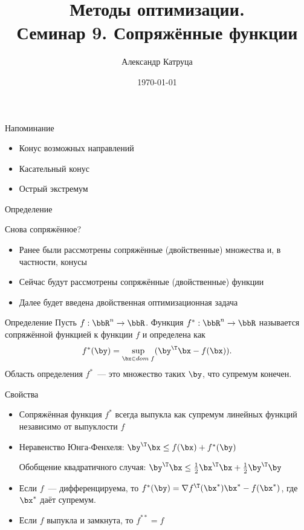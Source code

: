 \documentclass[12pt]{beamer}
\title[Семинар 9]{Методы оптимизации. \\
 Семинар 9. Сопряжённые функции}
\author{Александр Катруца}
\institute{Московский физико-технический институт,\\
Факультет Управления и Прикладной Математики}
\date{\today}
\begin{document}
\begin{frame}
\maketitle
\end{frame}

\begin{frame}{Напоминание}
\begin{itemize}
\item Конус возможных направлений
\item Касательный конус
\item Острый экстремум
\end{itemize}
\end{frame}

\begin{frame}{Определение}
\begin{block}{Снова сопряжённое?}
\begin{itemize}
\item Ранее были рассмотрены сопряжённые (двойственные) множества и, в частности, конусы
\item Сейчас будут рассмотрены сопряжённые (двойственные) функции
\item Далее будет введена двойственная оптимизационная задача 
\end{itemize}
\end{block}

\begin{block}{Определение}
Пусть $f: \bbR^n \rightarrow \bbR$. 
Функция $f^*: \bbR^n \rightarrow \bbR$ называется сопряжённой функцией к функции $f$ и определена как
\vspace{-4mm}
\[
f^*(\by) = \sup\limits_{\bx \in dom \; f} (\by^{\T}\bx - f(\bx)).
\vspace{-3mm}
\]
Область определения $f^*$~--- это множество таких $\by$, что супремум конечен. 

\end{block}
\end{frame}

\begin{frame}{Свойства}
\begin{itemize}
\item Сопряжённая функция $f^*$ всегда выпукла как супремум линейных функций независимо от выпуклости $f$
\item Неравенство Юнга-Фенхеля: $\by^{\T}\bx \leq f(\bx) + f^*(\by)$

Обобщение квадратичного случая: $\by^{\T}\bx \leq \frac{1}{2}\bx^{\T}\bx + \frac{1}{2}\by^{\T}\by$
\item Если $f$~--- дифференцируема, то $f^*(\by) = \nabla f^{\T}(\bx^*)\bx^* - f(\bx^*)$, где $\bx^*$ даёт супремум.
\item Если $f$ выпукла и замкнута, то $f^{**} = f$
\end{itemize}
\end{frame}
\end{document}
